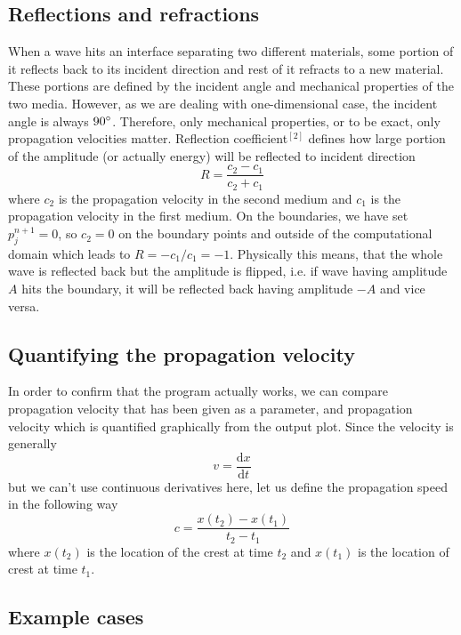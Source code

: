 \documentclass[]{article}
\begin{document}
\subsection{Reflections and refractions}
When a wave hits an interface separating two different materials, some portion of it reflects back to its incident direction and rest of it refracts to a new material. These portions are defined by the incident angle and mechanical properties of the two media. However, as we are dealing with one-dimensional case, the incident angle is always $90\degree$. Therefore, only mechanical properties, or to be exact, only propagation velocities matter. Reflection coefficient$^[2]$ defines how large portion of the amplitude (or actually energy) will be reflected to incident direction
\begin{equation}
	R=\frac{c_2-c_1}{c_2+c_1}
\end{equation}
where $c_2$ is the propagation velocity in the second medium and $c_1$ is the propagation velocity in the first medium. On the boundaries, we have set $p^{n+1}_j=0$, so $c_2=0$ on the boundary points and outside of the computational domain which leads to $R=-c_1/c_1=-1$. Physically this means, that the whole wave is reflected back but the amplitude is flipped, i.e. if wave having amplitude $A$ hits the boundary, it will be reflected back having amplitude $-A$ and vice versa. 

\subsection{Quantifying the propagation velocity}
In order to confirm that the program actually works, we can compare propagation velocity that has been given as a parameter, and propagation velocity which is quantified graphically from the output plot. Since the velocity is generally
\begin{equation}
	v=\frac{\textrm{d}x}{\textrm{d}t}
\end{equation}
but we can't use continuous derivatives here, let us define the propagation speed in the following way
\begin{equation}
	c=\frac{x(t_2)-x(t_1)}{t_2-t_1}
\end{equation} 
where $x(t_2)$ is the location of the crest at time $t_2$ and $x(t_1)$ is the location of crest at time $t_1$.

\subsection{Example cases}
\end{document}

